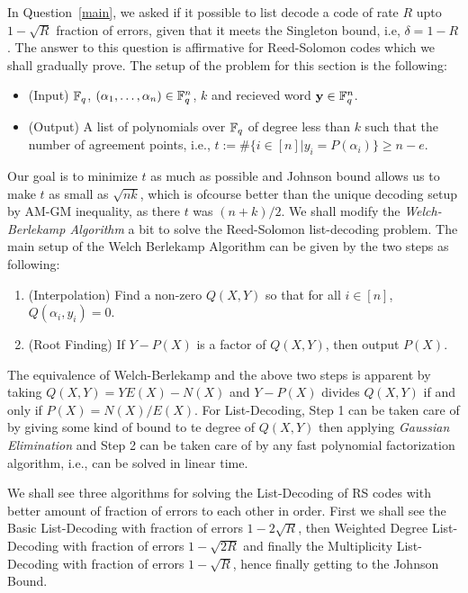 In Question~\ref{main}, we asked if it possible to list decode a code of rate $R$ upto $1-\sqrt{R}$ fraction of errors, given that it meets the Singleton bound, i.e, $\delta = 1 - R$. The answer to this question is affirmative for Reed-Solomon codes which we shall gradually prove. The setup of the problem for this section is the following:
\begin{problem}
	\noindent
	\begin{itemize}
		\item (Input) $\mathbb{F}_q$, $(\alpha_1,\ldots,\alpha_n)\in\mathbb{F}_q^n$, $k$ and recieved word $\mathbf{y}\in\mathbb{F}_q^n$.
		\item (Output) A list of polynomials over $\mathbb{F}_q$ of degree less than $k$ such that the number of agreement points, i.e., $t := \#\{i\in[n] | y_i = P(\alpha_i)\} \geq n - e$.
	\end{itemize}
\end{problem}

Our goal is to minimize $t$ as much as possible and Johnson bound allows us to make $t$ as small as $\sqrt{nk}$, which is ofcourse better than the unique decoding setup by AM-GM inequality, as there $t$ was $(n+k)/2$. We shall modify the \emph{Welch-Berlekamp Algorithm} a bit to solve the Reed-Solomon list-decoding problem. The main setup of the Welch Berlekamp Algorithm can be given by the two steps as following:

\begin{enumerate}
	\item (Interpolation) Find a non-zero $Q(X,Y)$ so that for all $i\in[n]$, $Q(\alpha_i, y_i) = 0$.
	\item (Root Finding) If $Y - P(X)$ is a factor of $Q(X,Y)$, then output $P(X)$.
\end{enumerate}

The equivalence of Welch-Berlekamp and the above two steps is apparent by taking $Q(X,Y) = YE(X) - N(X)$ and $Y - P(X)$ divides $Q(X,Y)$ if and only if $P(X) = N(X)/E(X)$. For List-Decoding, Step 1 can be taken care of by giving some kind of bound to te degree of $Q(X,Y)$ then applying \emph{Gaussian Elimination} and Step 2 can be taken care of by any fast polynomial factorization algorithm, i.e., can be solved in linear time.

We shall see three algorithms for solving the List-Decoding of RS codes with better amount of fraction of errors to each other in order. First we shall see the Basic List-Decoding with fraction of errors $1 - 2\sqrt{R}$, then Weighted Degree List-Decoding with fraction of errors $1 - \sqrt{2R}$ and finally the Multiplicity List-Decoding with fraction of errors $1 - \sqrt{R}$, hence finally getting to the Johnson Bound.


